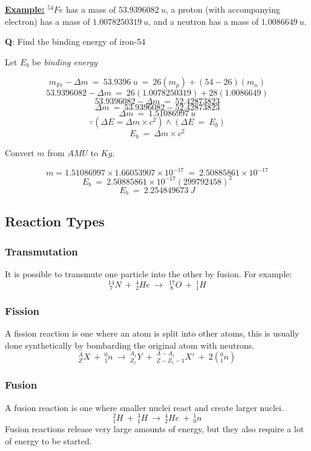 \documentclass[12pt]{article}
\begin{document}
\begin{boxA}
	\textbf{\underline{Example:}}\bigbreak
	$^{54}Fe$ has a mass of $53.9396082 \ u$, a proton (with accompanying electron)
 has a mass of $1.0078250319 \ u$, and a neutron has a mass of $1.0086649 \ u$. \bigbreak

 \textbf{Q}: Find the binding energy of iron-54 \bigbreak

 Let $E_b$ be \emph{binding energy}

$$m_{Fe} - \Delta m \ = \ 53.9396 \ u \ = \ 26(m_p) + (54-26)(m_n)$$
$$53.9396082 - \Delta m \ = \ 26(1.0078250319) + 28(1.0086649)$$
$$53.9396082 - \Delta m \ = \ 52.42873823$$
$$\Delta m \ = \ 53.9396082 - 52.42873823$$
$$\Delta m \ = \ 1.51086997 \ u$$ \bigbreak
$$\because \left(\Delta E = \Delta m \times c^2 \right) \land \left(\Delta E \ = \ E_b \right)$$
$$E_b \ = \ \Delta m \times c^2$$
\begin{center}
Convert $m$ from $AMU$ to $Kg$. 
\end{center}
$$m = 1.51086997 \times 1.66053907 \times 10^{-17} \ = \ 2.50885861 \times 10^{-17}$$
$$E_b \ = \ 2.50885861 \times 10^{-17}(299 792 458)^2$$
$$E_b \ = \ 2.254849673 \ J$$
\end{boxA}

\newpage

\subsection{Reaction Types}

\subsubsection{Transmutation}

It is possible to transmute one particle into the other by fusion. For example: $$^{14}_{\ 7}N \ + \ ^{4}_{2}He \ \rightarrow \ \ ^{17}_{\ 8}O \ + \ ^{1}_{1}H$$

\subsubsection{Fission}
A fission reaction is one where an atom is split into other atoms, this is usually done synthetically by 
bombarding the original atom with neutrons. $$^{A}_{Z}X \ + \ ^0_1n \ \rightarrow \ ^{A_1}_{Z_{1}}Y \ + \ ^{A-A_1}
_{Z-Z_1-1}X' \ + \ 2\left(^{0}_{1}n \right)$$


\subsubsection{Fusion}
A fusion reaction is one where smaller nuclei react and create larger nuclei.
$$_{1}^2H \ + \ _{1}^3H \ \rightarrow \ ^4_2He \ + \ ^1_0n$$
Fusion reactions release very large amounts of energy, but 
they also require a lot of energy to be started. \bigbreak 
\end{document}
